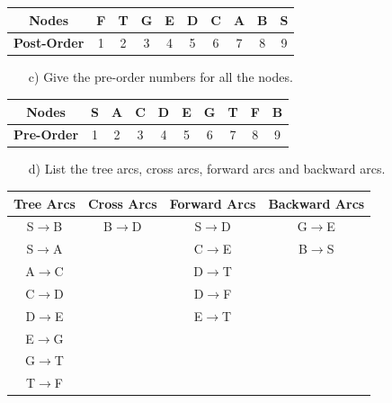 \documentclass{article}
\begin{document}
\begin{enumerate}[leftmargin=\labelsep]
\begin{center}
\begin{tabular}{ |c|c|c|c|c|c|c|c|c|c| } 
 \hline
  \textbf{Nodes} & F & T & G & E & D & C & A & B & S \\ 
 \hline
  \textbf{Post-Order} & 1 & 2 & 3 & 4 & 5 & 6 & 7 & 8 & 9 \\ 
 \hline
\end{tabular}
\end{center}

  \begin{enumerate}[leftmargin=\labelsep]
    \item[c)] Give the pre-order numbers for all the nodes.
  \end{enumerate}

\begin{center}
\begin{tabular}{ |c|c|c|c|c|c|c|c|c|c| } 
 \hline
  \textbf{Nodes} & S & A & C & D & E & G & T & F & B \\ 
 \hline
  \textbf{Pre-Order} & 1 & 2 & 3 & 4 & 5 & 6 & 7 & 8 & 9 \\ 
 \hline
\end{tabular}
\end{center}

  \begin{enumerate}[leftmargin=\labelsep]
    \item[d)] List the tree arcs, cross arcs, forward arcs and backward arcs.
  \end{enumerate}

\begin{center}
\begin{tabular}{ |c|c|c|c| } 
 \hline
  \textbf{Tree Arcs} & \textbf{Cross Arcs} & \textbf{Forward Arcs} & \textbf{Backward Arcs} \\ 
 \hline
  S$\rightarrow$B & B$\rightarrow$D & S$\rightarrow$D & G$\rightarrow$E \\
 \hline
  S$\rightarrow$A &  & C$\rightarrow$E & B$\rightarrow$S \\
 \hline
  A$\rightarrow$C &  & D$\rightarrow$T &  \\
 \hline
  C$\rightarrow$D &  & D$\rightarrow$F &  \\
 \hline
  D$\rightarrow$E &  & E$\rightarrow$T &  \\
 \hline
  E$\rightarrow$G &  &  &  \\
 \hline
  G$\rightarrow$T &  &  &  \\
 \hline
  T$\rightarrow$F &  &  &  \\
 \hline
\end{tabular}
\newline
\newline
\newline
\end{center}
\end{enumerate}
\end{document}
